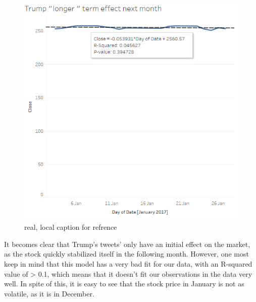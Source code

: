 \documentclass[12pt]{article}
\begin{document}
\begin{figure}[H] %
	\centering %
\includegraphics [scale= .6]  {TrumpJanuaryEffect.PNG}    %
	\caption[Optional caption] {real, local caption for refrence}
	\label{fig:wordcloudBliz}

\end{figure}

It becomes clear that Trump's tweets' only have an initial effect on the market, as the stock quickly stabilized itself in the following month. However, one most keep in mind that this model has a very bad fit for our data, with an R-squared value of > 0.1, which means that it doesn't fit our observations in the data very well. In spite of this, it is easy to see that the stock price in January is not as volatile, as it is in December.



\end{document}
